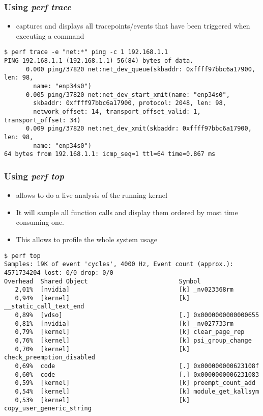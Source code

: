 \begin{frame}[fragile]
  \frametitle{Using {\em perf trace} }
  \begin{itemize}
    \item {} captures and displays all tracepoints/events that
          have been triggered when executing a command
  \end{itemize}

  \begin{block}{}
    \begin{verbatim}
$ perf trace -e "net:*" ping -c 1 192.168.1.1
PING 192.168.1.1 (192.168.1.1) 56(84) bytes of data.
      0.000 ping/37820 net:net_dev_queue(skbaddr: 0xffff97bbc6a17900, len: 98,
        name: "enp34s0")
      0.005 ping/37820 net:net_dev_start_xmit(name: "enp34s0",
        skbaddr: 0xffff97bbc6a17900, protocol: 2048, len: 98,
        network_offset: 14, transport_offset_valid: 1, transport_offset: 34)
      0.009 ping/37820 net:net_dev_xmit(skbaddr: 0xffff97bbc6a17900, len: 98,
        name: "enp34s0")
64 bytes from 192.168.1.1: icmp_seq=1 ttl=64 time=0.867 ms
    \end{verbatim}
  \end{block}
\end{frame}

\begin{frame}[fragile]
  \frametitle{Using {\em perf top} }
  \begin{itemize}
    \item {} allows to do a live analysis of the running kernel
    \item It will sample all function calls and display them ordered by most
          time consuming one.
    \item This allows to profile the whole system usage
  \end{itemize}

  \begin{block}{}
    \begin{verbatim}
$ perf top
Samples: 19K of event 'cycles', 4000 Hz, Event count (approx.): 4571734204 lost: 0/0 drop: 0/0
Overhead  Shared Object                         Symbol
   2,01%  [nvidia]                              [k] _nv023368rm
   0,94%  [kernel]                              [k] __static_call_text_end
   0,89%  [vdso]                                [.] 0x0000000000000655
   0,81%  [nvidia]                              [k] _nv027733rm
   0,79%  [kernel]                              [k] clear_page_rep
   0,76%  [kernel]                              [k] psi_group_change
   0,70%  [kernel]                              [k] check_preemption_disabled
   0,69%  code                                  [.] 0x000000000623108f
   0,60%  code                                  [.] 0x0000000006231083
   0,59%  [kernel]                              [k] preempt_count_add
   0,54%  [kernel]                              [k] module_get_kallsym
   0,53%  [kernel]                              [k] copy_user_generic_string
    \end{verbatim}
  \end{block}
\end{frame}

